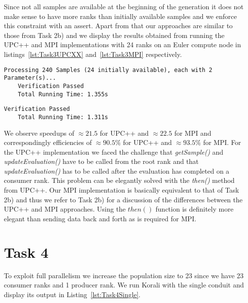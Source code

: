 \documentclass[11pt]{article}
\begin{document}
    Since not all samples are available at the beginning of the generation
    it does not make sense to have more ranks than initially available
    samples and we enforce this constraint with an assert.
    Apart from that our approaches are similar to those from Task 2b) and we
    display the results obtained from running the UPC++ and MPI
    implementations with 24 ranks on an Euler compute node in
    listings~\ref{lst:Task3UPCXX} and~\ref{lst:Task3MPI} respectively.

    \begin{lstlisting}[basicstyle=\tiny, frame=single, caption={Output from
    executing the UPC++ tasking engine .},
    label={lst:Task3UPCXX}]
    Processing 240 Samples (24 initially available), each with 2 Parameter(s)...
    Verification Passed
    Total Running Time: 1.355s
    \end{lstlisting}

    \begin{lstlisting}[basicstyle=\tiny, frame=single, caption={Output from
    executing the MPI tasking engine .},
    label={lst:Task3MPI}]
    Verification Passed
    Total Running Time: 1.311s
    \end{lstlisting}

    We observe speedups of $\approx 21.5$ for UPC++ and $\approx 22.5$ for
    MPI and correspondingly efficiencies of $\approx 90.5\%$ for UPC++ and
    $\approx 93.5\%$ for MPI.\@
    For the UPC++ implementation we faced the challenge that
    \mbox{\textit{getSample()}} and \mbox{\textit{updateEvaluation()}}
    have to be called from the root rank and that
    \mbox{\textit{updateEvaluation()}} has to be called after the evaluation
    has completed on a consumer rank.
    This problem can be elegantly solved with the \textit{then()} method
    from UPC++.
    Our MPI implementation is basically equivalent to that of Task 2b) and
    thus we refer to Task 2b) for a discussion of the differences between
    the UPC++ and MPI approaches.
    Using the $then()$ function is definitely more elegant than sending data
    back and forth as is required for MPI.\@

    \section*{Task 4}
    \label{sec:Task4}

    To exploit full parallelism we increase the population size to 23 since
    we have 23 consumer ranks and 1 producer rank.
    We run Korali with the single conduit and display its output in
    Listing~\ref{lst:Task4Single}.
\end{document}
